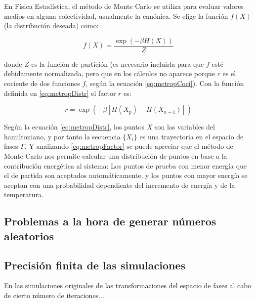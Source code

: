 \documentclass[11pt, a4paper]{article} %
\theoremstyle{named}
\begin{document}
En Física Estadística, el método de Monte Carlo se utiliza para evaluar valores medios en alguna colectividad, usualmente la canónica. Se elige la función $f(X)$ (la distribución deseada) como:

\begin{equation}\label{eq:metropDistr}
f(X) = \frac{\exp(-\beta H(X))}{Z}
\end{equation}

donde $Z$ es la función de partición (es necesario incluirla para que $f$ esté debidamente normalizada, pero que en los cálculos no aparece porque $r$ es el cociente de dos funciones $f$, según la ecuación \eqref{eq:metropCoci}). Con la función definida en \eqref{eq:metropDistr} el factor $r$ es:

\begin{equation}\label{eq:metropFactor}
r = \exp (-\beta [H(X_p) - H(X_{n-1})])
\end{equation}

Según la ecuación \eqref{eq:metropDistr}, los puntos $X$ son las variables del hamiltoniano, y por tanto la secuencia $\{X_i\}$ es una trayectoria en el espacio de fases $\Gamma$. Y analizando \eqref{eq:metropFactor} se puede apreciar que el método de Monte-Carlo nos permite calcular una distribución de puntos en base a la contribución energética al sistema: Los puntos de prueba con menor energía que el de partida son aceptados automáticamente, y los puntos con mayor energía se aceptan con una probabilidad dependiente del incremento de energía y de la temperatura.

\subsection{Problemas a la hora de generar números aleatorios}

\subsection{Precisión finita de las simulaciones}\label{sec:precision}

En las simulaciones originales de las transformaciones del espacio de fases al cabo de cierto número de iteraciones...

\newpage
\nocite{salcido}
\nocite{haro}
\nocite{gottwald}
\nocite{schroeder}
\nocite{pathria}
\nocite{huang}
\nocite{allen}
\nocite{krauth}
\nocite{greinier}
\nocite{koonin}
\nocite{wannier}
\nocite{reif}
\nocite{ashcroft}
\nocite{dyson}



\end{document}
